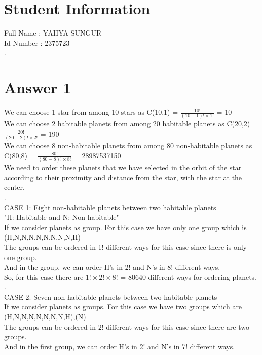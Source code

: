 \documentclass[11pt]{article}
\begin{document}
\section*{Student Information } 
Full Name : YAHYA SUNGUR \\
Id Number : 2375723 \\
.
\section*{Answer 1}
We can choose 1 star from among 10 stars as C(10,1) = $\frac{10!}{(10-1)!\times1!}$ = 10\\
We can choose 2 habitable planets from among 20 habitable planets as C(20,2) = $\frac{20!}{(20-2)!\times2!}$ = 190\\
We can choose 8 non-habitable planets from among 80 non-habitable planets as C(80,8) = $\frac{80!}{(80-8)!\times8!}$ = 28987537150 \\
We need to order these planets that we have selected in the orbit of the star according to their proximity and distance from the star, with the star at the center.\\
.\\
CASE 1: Eight non-habitable planets between two habitable planets \\
"H: Habitable and N: Non-habitable" \\
If we consider planets as group. For this case we have only one group which is (H,N,N,N,N,N,N,N,N,H) \\
The groups can be ordered in 1! different ways for this case since there is only one group.\\
And in the group, we can order H's in 2! and N's in 8! different ways. \\
So, for this case there are $1!\times2!\times8!$ = 80640 different ways for ordering planets. \\
.\\
CASE 2: Seven non-habitable planets between two habitable planets \\
If we consider planets as groups. For this case we have two groups which are (H,N,N,N,N,N,N,N,H),(N) \\
The groups can be ordered in 2! different ways for this case since there are two groups.\\
And in the first group, we can order H's in 2! and N's in 7! different ways. \\
\end{document}
